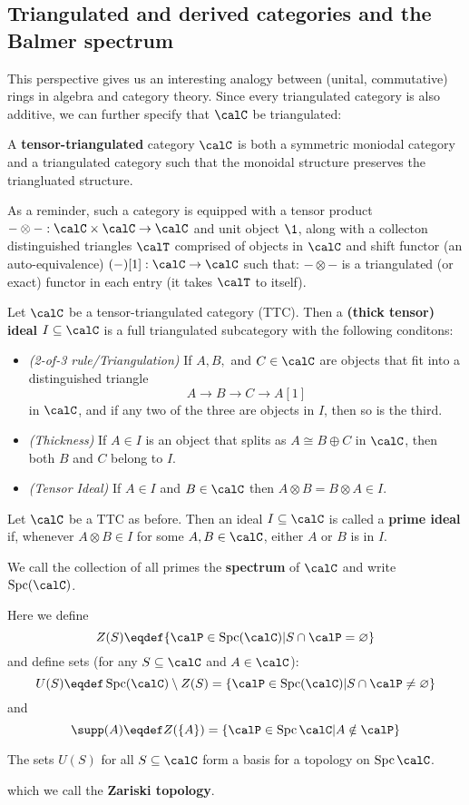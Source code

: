 \documentclass[12pt]{article}
\DeclareMathOperator{\Spc}{Spc}
\begin{document}
	\subsection{Triangulated and derived categories and the Balmer spectrum}
	This perspective gives us an interesting analogy between (unital, commutative) rings in algebra and category theory. Since every 
	triangulated category is also additive, we can further specify that $\calC$ be triangulated:
	\begin{defn}
		A \textbf{tensor-triangulated} category $\calC$ is both a symmetric moniodal category and a triangulated category such that 
		the monoidal structure preserves the triangluated structure. 

		As a reminder, such a category is equipped with a tensor product $-\otimes -:\calC\times\calC\to \calC$ and unit object $\1$, along with
		a collecton distinguished triangles $\calT$ comprised of objects in $\calC$ and shift functor (an auto-equivalence) $(-)[1]:\calC\to \calC$ such that:
		$-\otimes-$ is a triangulated (or exact) functor in each entry (it takes $\calT$ to itself).
	\end{defn}
	\begin{defn}
		Let $\calC$ be a tensor-triangulated category (TTC). Then a \textbf{(thick tensor) ideal} $I\subseteq \calC$ is a full triangulated subcategory 
		with the following conditons:
		\begin{itemize}
			\item \textit{(2-of-3 rule/Triangulation)} If $A,B,$ and $C\in\calC$ are objects that fit into a distinguished triangle
			\[A\to B\to C\to A[1]\]
			in $\calC$, and if any two of the three are objects in $I$, then so is the third.
			\item \textit{(Thickness)} If $A\in I$ is an object that splits as $A\cong B\oplus C$ in $\calC$, then both $B$ and $C$ belong to $I$.
			\item \textit{(Tensor Ideal)} If $A\in I$ and $B\in \calC$ then $A\otimes B=B\otimes A\in I$.
		\end{itemize}
	\end{defn}
	\begin{defn}
		Let $\calC$ be a TTC as before. Then an ideal $I\subseteq\calC$ is called a \textbf{prime ideal}
		if, whenever $A\otimes B\in I$ for some $A,B\in \calC$, either $A$ or $B$ is in $I$.
	
		We call the collection of all primes the \textbf{spectrum} of $\calC$ and write 
		$\operatorname{Spc}(\calC)$.
	\end{defn}
	Here we define
	\[Z(S)\eqdef\{\calP\in\Spc(\calC)|S\cap\calP=\varnothing\}\]
	and define sets (for any $S\subseteq\calC$ and $A\in \calC$):
	\[U(S)\eqdef \Spc(\calC)\setminus Z(S)=\{\calP\in\Spc(\calC)|S\cap \calP\ne\varnothing\}\]
	and
	\[\supp(A)\eqdef Z(\{A\})=\{\calP\in\Spc\calC|A\notin \calP\}\]
	\begin{lem}
		The sets $U(S)$ for all $S\subseteq\calC$ form a basis for a topology on $\Spc\calC$.
	\end{lem}
	which we call the \textbf{Zariski topology}.
\end{document}
